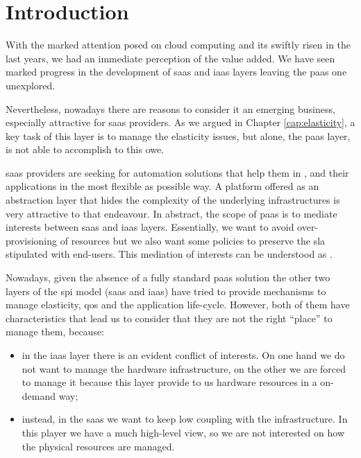 %
%
\section{Introduction}
\label{sec:architecture-introduction}
With the marked attention posed on cloud computing and its swiftly risen in the last years, we had
an immediate perception of the value added. We have seen marked progress in the development of
\ac{saas} and \ac{iaas} layers leaving the \ac{paas} one unexplored.

Nevertheless, nowadays there are reasons to consider it an emerging business, especially attractive
for \ac{saas} providers. As we argued in Chapter \ref{cap:elasticity}, a key task of this layer is
to manage the elasticity issues, but alone, the \ac{paas} layer, is not able to accomplish to this owe.

\ac{saas} providers are seeking for automation solutions that help them in ,
 and  their applications in the most flexible as possible way. A
platform offered as an abstraction layer that hides the complexity of the underlying infrastructures
is very attractive to that endeavour. In abstract, the scope of \ac{paas} is to mediate interests
between \ac{saas} and \ac{iaas} layers. Essentially, we want to avoid over-provisioning of resources
but we also want some policies to preserve the \ac{sla} stipulated with end-users. This mediation
of interests can be understood as .

Nowadays, given the absence of a fully standard \ac{paas} solution the other two layers of the \ac{spi}
model (\ac{saas} and \ac{iaas}) have tried to provide mechanisms to manage elasticity, \ac{qos} and the
application life-cycle. However, both of them have characteristics that lead us to consider that they are
not the right ``place'' to manage them, because:

\begin{itemize}
	\item{in the \ac{iaas} layer there is an evident conflict of interests. On one hand we do not want
		to manage the hardware infrastructure, on the other we are forced to manage it because this layer
		provide to us hardware resources in a on-demand way;}
	\item{instead, in the \ac{saas} we want to keep low coupling with the infrastructure. In this player
		we have a much high-level view, so we are not interested on how the physical resources
		are managed.}
\end{itemize}

